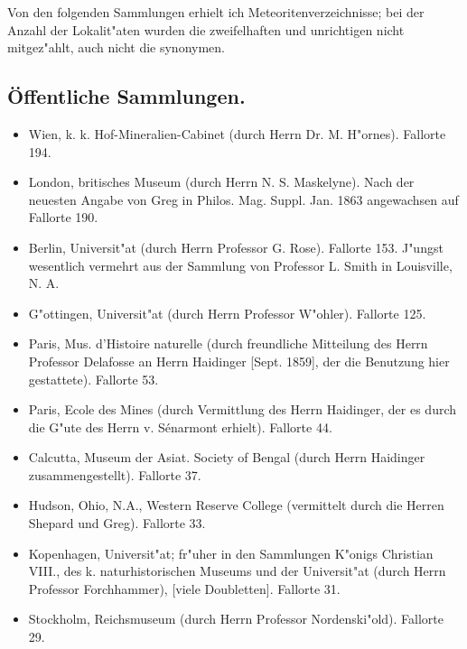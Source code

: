 \documentclass[a4paper, 11pt, oneside]{article}
\begin{document}
Von den folgenden Sammlungen erhielt ich Meteoritenverzeichnisse; bei der Anzahl der Lokalit"aten wurden die zweifelhaften und unrichtigen nicht mitgez"ahlt, auch nicht die synonymen.
\clearpage
\subsection*{Öffentliche Sammlungen.}
\begin{itemize}
    \item Wien, k. k. Hof-Mineralien-Cabinet (durch Herrn Dr. M. H"ornes). Fallorte 194.

    \item London, britisches Museum (durch Herrn N. S. Maskelyne). Nach der neuesten Angabe von Greg in Philos. Mag. Suppl. Jan. 1863 angewachsen auf Fallorte 190.

    \item Berlin, Universit"at (durch Herrn Professor G. Rose). Fallorte 153. J"ungst wesentlich vermehrt aus der Sammlung von Professor L. Smith in Louisville, N. A.

    \item G"ottingen, Universit"at (durch Herrn Professor W"ohler). Fallorte 125.

    \item Paris, Mus. d'Histoire naturelle (durch freundliche Mitteilung des Herrn Professor Delafosse an Herrn Haidinger [Sept. 1859], der die Benutzung hier gestattete). Fallorte 53.

    \item Paris, Ecole des Mines (durch Vermittlung des Herrn Haidinger, der es durch die G"ute des Herrn v. Sénarmont erhielt). Fallorte 44.

    \item Calcutta, Museum der Asiat. Society of Bengal (durch Herrn Haidinger zusammengestellt). Fallorte 37.

    \item Hudson, Ohio, N.A., Western Reserve College (vermittelt durch die Herren Shepard und Greg). Fallorte 33.

    \item Kopenhagen, Universit"at; fr"uher in den Sammlungen K"onigs Christian VIII., des k. naturhistorischen Museums und der Universit"at (durch Herrn Professor Forchhammer), [viele Doubletten]. Fallorte 31.

    \item Stockholm, Reichsmuseum (durch Herrn Professor Nordenski"old). Fallorte 29.


\end{itemize}
\end{document}
